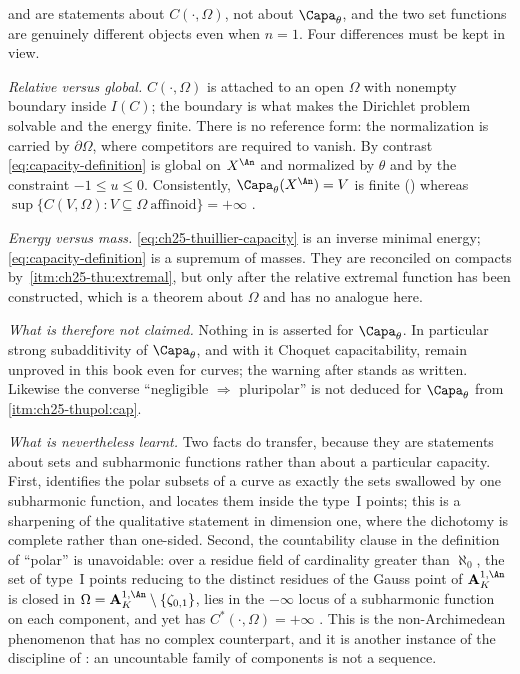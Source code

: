\begin{remark}
\label{rem:ch25-thuillier-vs-bfj}
 and  are
statements about $C(\cdot,\Omega)$, not about $\Capa_\theta$, and the two
set functions are genuinely different objects even when $n=1$.  Four
differences must be kept in view.

\emph{Relative versus global.}  $C(\cdot,\Omega)$ is attached to an open
$\Omega$ with nonempty boundary inside $I(C)$; the boundary is what
makes the Dirichlet problem solvable and the energy finite.  There is no
reference form: the normalization is carried by $\partial\Omega$, where
competitors are required to vanish.  By contrast
\eqref{eq:capacity-definition} is global on $X^{\An}$ and normalized by
$\theta$ and by the constraint $-1\leq u\leq0$.  Consistently,
$\Capa_\theta(X^{\An})=V$ is finite
() whereas
$\sup\{C(V,\Omega):V\subseteq\Omega\ \text{affinoid}\}=+\infty$
\cite[Lemme~3.6.28]{Thu05}.

\emph{Energy versus mass.}  \eqref{eq:ch25-thuillier-capacity} is an
inverse minimal energy; \eqref{eq:capacity-definition} is a supremum of
masses.  They are reconciled on compacts by
\,\cref{itm:ch25-thu:extremal}, but only
after the relative extremal function has been constructed, which is a
theorem about $\Omega$ and has no analogue here.

\emph{What is therefore not claimed.}  Nothing in
 is asserted for $\Capa_\theta$.  In
particular strong subadditivity of $\Capa_\theta$, and with it Choquet
capacitability, remain unproved in this book even for curves; the warning
after  stands as written.  Likewise the
converse ``negligible $\Rightarrow$ pluripolar'' is not deduced for
$\Capa_\theta$ from
\,\cref{itm:ch25-thupol:cap}.

\emph{What is nevertheless learnt.}  Two facts do transfer, because they are
statements about sets and subharmonic functions rather than about a
particular capacity.  First,
 identifies the polar subsets of a curve as
exactly the sets swallowed by one subharmonic function, and locates them
inside the type~$\mathrm{I}$ points; this is a sharpening of the
qualitative statement  in dimension
one, where the dichotomy is complete rather than one-sided.  Second, the
countability clause in the definition of ``polar'' is unavoidable: over a
residue field of cardinality greater than $\aleph_0$, the set of type~I
points reducing to the distinct residues of the Gauss point of
$\mathbf A^{1,\An}_K$ is closed in
$\Omega=\mathbf A^{1,\An}_K\setminus\{\zeta_{0,1}\}$, lies in the
$-\infty$ locus of a subharmonic function on each component, and yet has
$C^*(\cdot,\Omega)=+\infty$ \cite[Remarque~3.6.12]{Thu05}.  This is the
non-Archimedean phenomenon that has no complex counterpart, and it is
another instance of the discipline of : an uncountable
family of components is not a sequence.
\end{remark}

